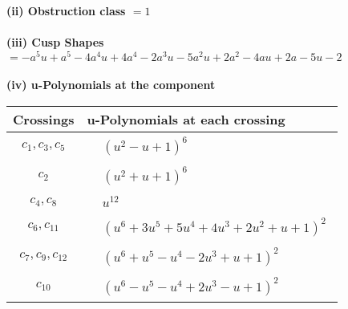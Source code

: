 \documentclass[1p]{elsarticle_modified}
\theoremstyle{definition}
\begin{document}
\flushleft \textbf{(ii) Obstruction class $= 1$}\\~\\
\flushleft \textbf{(iii) Cusp Shapes $= - a^5 u+a^5-4 a^4 u+4 a^4-2 a^3 u-5 a^2 u+2 a^2-4 a u+2 a-5 u-2$}\\~\\
\newpage\renewcommand{\arraystretch}{1}
\flushleft \textbf{(iv) u-Polynomials at the component}\newline \\
\begin{tabular}{m{50pt}|m{274pt}}
Crossings & \hspace{64pt}u-Polynomials at each crossing \\
\hline $$\begin{aligned}c_{1},c_{3},c_{5}\end{aligned}$$&$\begin{aligned}
&(u^2- u+1)^6
\end{aligned}$\\
\hline $$\begin{aligned}c_{2}\end{aligned}$$&$\begin{aligned}
&(u^2+u+1)^6
\end{aligned}$\\
\hline $$\begin{aligned}c_{4},c_{8}\end{aligned}$$&$\begin{aligned}
&u^{12}
\end{aligned}$\\
\hline $$\begin{aligned}c_{6},c_{11}\end{aligned}$$&$\begin{aligned}
&(u^6+3 u^5+5 u^4+4 u^3+2 u^2+u+1)^2
\end{aligned}$\\
\hline $$\begin{aligned}c_{7},c_{9},c_{12}\end{aligned}$$&$\begin{aligned}
&(u^6+u^5- u^4-2 u^3+u+1)^2
\end{aligned}$\\
\hline $$\begin{aligned}c_{10}\end{aligned}$$&$\begin{aligned}
&(u^6- u^5- u^4+2 u^3- u+1)^2
\end{aligned}$\\
\hline
\end{tabular}\\~\\
\end{document}
